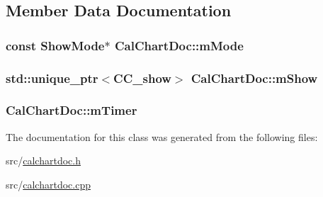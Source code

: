 \subsection{Member Data Documentation}
\hypertarget{a00020_ae511411f0afc9c334fea3f2df435e893}{
\subsubsection[{m\-Mode}]{\setlength{\rightskip}{0pt plus 5cm}const {\bf Show\-Mode}$\ast$ Cal\-Chart\-Doc\-::m\-Mode\hspace{0.3cm}{\ttfamily [private]}}}\label{a00020_ae511411f0afc9c334fea3f2df435e893}
\hypertarget{a00020_a42ef10531f8c3d4a0bedc609fdf66936}{
\subsubsection[{m\-Show}]{\setlength{\rightskip}{0pt plus 5cm}std\-::unique\-\_\-ptr$<${\bf C\-C\-\_\-show}$>$ Cal\-Chart\-Doc\-::m\-Show\hspace{0.3cm}{\ttfamily [private]}}}\label{a00020_a42ef10531f8c3d4a0bedc609fdf66936}
\hypertarget{a00020_a74f920890947909b3c2a8d8cac6d1f78}{
\subsubsection[{m\-Timer}]{ Cal\-Chart\-Doc\-::m\-Timer\hspace{0.3cm}{\ttfamily [private]}}}\label{a00020_a74f920890947909b3c2a8d8cac6d1f78}


The documentation for this class was generated from the following files\-:\begin{DoxyCompactItemize}
\item 
src/\hyperlink{a00181}{calchartdoc.\-h}\item 
src/\hyperlink{a00180}{calchartdoc.\-cpp}\end{DoxyCompactItemize}
